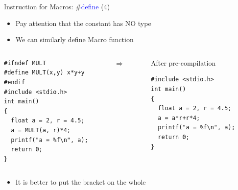 \begin{frame}[fragile]{Instruction for Macros: \#\textcolor{blue}{define} (4)}
\begin{itemize}
	\item {Pay attention that the constant has NO type}
	\item {We can similarly define Macro function}
\end{itemize}
\begin{columns}
\begin{column}{0.44\linewidth}
\begin{lstlisting}[linewidth=0.9\linewidth]
#ifndef MULT
#define MULT(x,y) x*y+y
#endif
#include <stdio.h>
int main()
{
  float a = 2, r = 4.5;
  a = MULT(a, r)*4;
  printf("a = %f\n", a);
  return 0;
}
\end{lstlisting}
\end{column}
\begin{column}{0.1\linewidth}
\begin{center}
\vspace{0.6in}
$\Longrightarrow$
\end{center}
\end{column}
\begin{column}{0.40\linewidth}
\begin{block}{After pre-compilation}
\end{block} 
\begin{lstlisting}
#include <stdio.h>
int main()
{
  float a = 2, r = 4.5;
  a = a*r+r*4;
  printf("a = %f\n", a);
  return 0;
}
\end{lstlisting}
\end{column}
\end{columns}
\begin{itemize}
	\item {It is better to put the bracket on the whole}
\end{itemize}
\end{frame}

